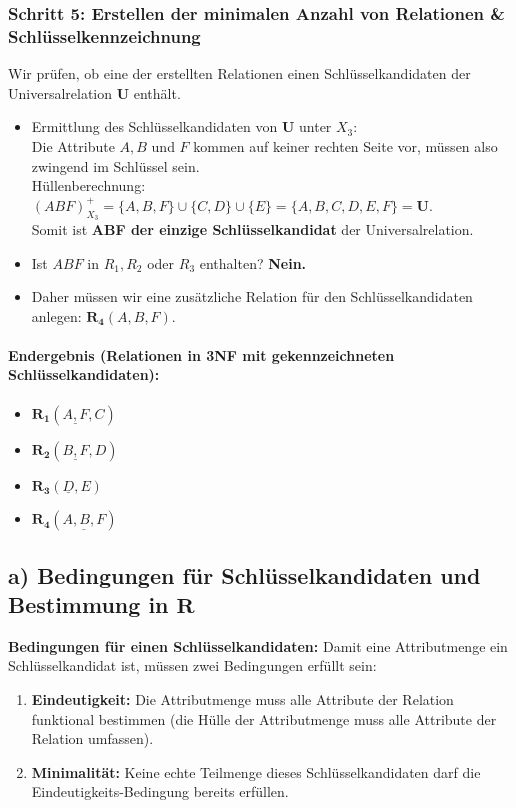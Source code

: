 \documentclass[12pt]{scrartcl}
\begin{document}
\subsubsection*{Schritt 5: Erstellen der minimalen Anzahl von Relationen \& Schlüsselkennzeichnung}
Wir prüfen, ob eine der erstellten Relationen einen Schlüsselkandidaten der Universalrelation $\mathbf{U}$ enthält.
\begin{itemize}
    \item Ermittlung des Schlüsselkandidaten von $\mathbf{U}$ unter $X_3$: \\
    Die Attribute $A, B$ und $F$ kommen auf keiner rechten Seite vor, müssen also zwingend im Schlüssel sein. \\
    Hüllenberechnung: $(ABF)^+_{X_3} = \{A, B, F\} \cup \{C, D\} \cup \{E\} = \{A, B, C, D, E, F\} = \mathbf{U}$. \\
    Somit ist \textbf{ABF der einzige Schlüsselkandidat} der Universalrelation.
    \item Ist $ABF$ in $R_1, R_2$ oder $R_3$ enthalten? \textbf{Nein.}
    \item Daher müssen wir eine zusätzliche Relation für den Schlüsselkandidaten anlegen: $\mathbf{R_4}(A, B, F)$.
\end{itemize}

\paragraph{Endergebnis (Relationen in 3NF mit gekennzeichneten Schlüsselkandidaten):}
\begin{itemize}
    \item $\mathbf{R_1}(\underline{A, F}, C)$
    \item $\mathbf{R_2}(\underline{B, F}, D)$
    \item $\mathbf{R_3}(\underline{D}, E)$
    \item $\mathbf{R_4}(\underline{A, B, F})$
\end{itemize}


\subsection*{a) Bedingungen für Schlüsselkandidaten und Bestimmung in $\mathbf{R}$}

\textbf{Bedingungen für einen Schlüsselkandidaten:}
Damit eine Attributmenge ein Schlüsselkandidat ist, müssen zwei Bedingungen erfüllt sein:
\begin{enumerate}
    \item \textbf{Eindeutigkeit:} Die Attributmenge muss alle Attribute der Relation funktional bestimmen (die Hülle der Attributmenge muss alle Attribute der Relation umfassen).
    \item \textbf{Minimalität:} Keine echte Teilmenge dieses Schlüsselkandidaten darf die Eindeutigkeits-Bedingung bereits erfüllen.
\end{enumerate}
\end{document}
